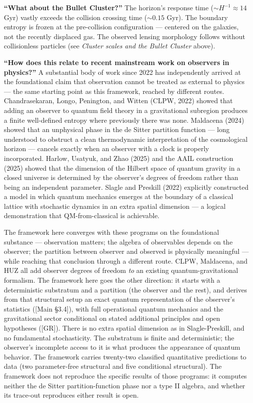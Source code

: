 \documentclass[
]{article}
\begin{document}
\textbf{``What about the Bullet Cluster?''} The horizon's response time
(\(\sim H^{-1} \approx 14\) Gyr) vastly exceeds the collision crossing
time (\(\sim 0.15\) Gyr). The boundary entropy is frozen at the
pre-collision configuration --- centered on the galaxies, not the
recently displaced gas. The observed lensing morphology follows without
collisionless particles (see \emph{Cluster scales and the Bullet
Cluster} above).

\textbf{``How does this relate to recent mainstream work on observers in
physics?''} A substantial body of work since 2022 has independently
arrived at the foundational claim that observation cannot be treated as
external to physics --- the same starting point as this framework,
reached by different routes. Chandrasekaran, Longo, Penington, and
Witten (CLPW, 2022) showed that adding an observer to quantum field
theory in a gravitational subregion produces a finite well-defined
entropy where previously there was none. Maldacena (2024) showed that an
unphysical phase in the de Sitter partition function --- long understood
to obstruct a clean thermodynamic interpretation of the cosmological
horizon --- cancels exactly when an observer with a clock is properly
incorporated. Harlow, Usatyuk, and Zhao (2025) and the AAIL construction
(2025) showed that the dimension of the Hilbert space of quantum gravity
in a closed universe is determined by the observer's degrees of freedom
rather than being an independent parameter. Slagle and Preskill (2022)
explicitly constructed a model in which quantum mechanics emerges at the
boundary of a classical lattice with stochastic dynamics in an extra
spatial dimension --- a logical demonstration that QM-from-classical is
achievable.

The framework here converges with these programs on the foundational
substance --- observation matters; the algebra of observables depends on
the observer; the partition between observer and observed is physically
meaningful --- while reaching that conclusion through a different route.
CLPW, Maldacena, and HUZ all add observer degrees of freedom \emph{to}
an existing quantum-gravitational formalism. The framework here goes the
other direction: it starts with a deterministic substratum and a
partition (the observer and the rest), and derives from that structural
setup an exact quantum representation of the observer's statistics
({[}Main §3.4{]}), with full operational quantum mechanics and the
gravitational sector conditional on stated additional principles and
open hypotheses ({[}GR{]}). There is no extra spatial dimension as in
Slagle-Preskill, and no fundamental stochasticity. The substratum is
finite and deterministic; the observer's incomplete access to it is what
produces the appearance of quantum behavior. The framework carries
twenty-two classified quantitative predictions to data (two
parameter-free structural and five conditional structural). The
framework does not reproduce the specific results of those programs: it
computes neither the de Sitter partition-function phase nor a type II
algebra, and whether its trace-out reproduces either result is open.
\end{document}
